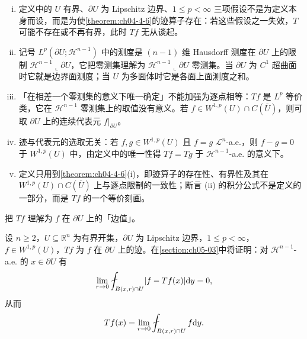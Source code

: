\documentclass[../../main.tex]{subfiles}%
\begin{document}
\begin{remark}\label{remark:ch04-def-4-5-条件}
\begin{enumerate}[(i)]
\item 定义中的 $U$ 有界、$\partial U$ 为 Lipschitz 边界、$1\leqslant p<\infty$ 三项假设不是为定义本身而设，而是为使\cref{theorem:ch04-4-6}的迹算子存在：若这些假设之一失效，$T$ 可能不存在或不再有界，此时 $Tf$ 无从谈起。%
\item 记号 $L^p(\partial U;\mathcal{H}^{n-1})$ 中的测度是 $(n-1)$ 维 Hausdorff 测度在 $\partial U$ 上的限制 $\mathcal{H}^{n-1}\llcorner\partial U$，它把零测集理解为 $\mathcal{H}^{n-1}\llcorner\partial U$ 零测集。当 $\partial U$ 为 $C^1$ 超曲面时它就是边界面测度；当 $U$ 为多面体时它是各面上面测度之和。
\item 「在相差一个零测集的意义下唯一确定」不能加强为逐点相等：$Tf$ 是 $L^p$ 等价类，它在 $\mathcal{H}^{n-1}$ 零测集上的取值没有意义。若 $f\in W^{1,p}(U)\cap C(\overline{U})$，则可取 $\partial U$ 上的连续代表元 $f|_{\partial U}$。
\item 迹与代表元的选取无关：若 $f,g\in W^{1,p}(U)$ 且 $f=g$ $\mathcal{L}^n$-a.e.，则 $f-g=0$ 于 $W^{1,p}(U)$ 中，由定义中的唯一性得 $Tf=Tg$ 于 $\mathcal{H}^{n-1}$-a.e. 的意义下。
\item 定义只用到\cref{theorem:ch04-4-6}(i)，即迹算子的存在性、有界性及其在 $W^{1,p}(U)\cap C(\overline{U})$ 上与逐点限制的一致性；断言 (ii) 的积分公式不是定义的一部分，而是 $Tf$ 的一个等价刻画。%
\end{enumerate}
\end{remark}

把 $Tf$ 理解为 $f$ 在 $\partial U$ 上的「边值」。

\begin{remark}\label{remark:ch04-def-4-5-边界值}
设 $n\geqslant2$，$U\subseteq\mathbb{R}^n$ 为有界开集，$\partial U$ 为 Lipschitz 边界，$1\leqslant p<\infty$，$f\in W^{1,p}(U)$，$Tf$ 为 $f$ 在 $\partial U$ 上的迹。在\cref{section:ch05-03}中将证明：对 $\mathcal{H}^{n-1}$-a.e. 的 $x\in\partial U$ 有 %
\begin{align*}
\lim_{r\to0}\fint_{B(x,r)\cap U}\lvert f-Tf(x)\rvert\diff y=0,
\end{align*}
从而
\begin{align*}
Tf(x)=\lim_{r\to0}\fint_{B(x,r)\cap U}f\diff y .
\end{align*}
\end{remark}
\end{document}
